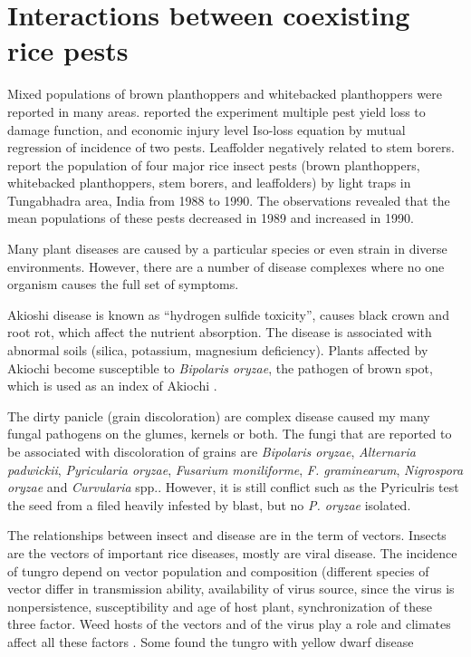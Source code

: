 \documentclass[12pt, oneside]{report}
\begin{document}
\section*{Interactions between coexisting rice pests}

Mixed populations of brown planthoppers and whitebacked planthoppers were reported in many areas. \cite{naganagoud2010studies} reported the experiment multiple pest yield loss to damage function, and economic injury level Iso-loss equation by mutual regression of incidence of two pests. Leaffolder negatively related to stem borers. \cite{selvaraj2012determination} report the population of four major rice insect pests (brown planthoppers, whitebacked planthoppers, stem borers, and leaffolders) by light traps in Tungabhadra area, India from 1988 to 1990. The observations revealed that the mean populations of these pests decreased in 1989 and increased in 1990.

Many plant diseases are caused by a particular species or even strain in diverse environments. However, there are a number of disease complexes where no one organism causes the full set of symptoms.

Akioshi disease is known as ``hydrogen sulfide toxicity'', causes black crown and root rot, which affect the nutrient absorption. The disease is associated with abnormal soils (silica, potassium, magnesium deficiency). Plants affected by Akiochi become susceptible to \textit{Bipolaris oryzae}, the pathogen of brown spot, which is used as an index of Akiochi \citep{ouricedisease}.

The dirty panicle (grain discoloration) are complex disease caused my many fungal pathogens on the glumes, kernels or both. The fungi that are reported to be associated with discoloration of grains are \textit{Bipolaris oryzae}, \textit{Alternaria padwickii}, \textit{Pyricularia oryzae}, \textit{Fusarium moniliforme}, \textit{F. graminearum}, \textit{Nigrospora oryzae} and \textit{Curvularia} spp.\cite{ouricedisease}. However, it is still conflict such as the Pyriculris test the seed from a filed heavily infested by blast, but no \textit{P. oryzae} isolated.

The relationships between insect and disease are in the term of vectors. Insects are the vectors of important rice diseases, mostly are viral disease. The incidence of tungro depend on vector population and composition (different species of vector differ in transmission ability, availability of virus source, since the virus is nonpersistence, susceptibility and age of host plant, synchronization of these three factor. Weed hosts of the vectors and of the virus play a role and climates affect all these factors \cite{naganagoud2010studies}. Some found the tungro with yellow dwarf disease \cite{ouricedisease}
\end{document}
